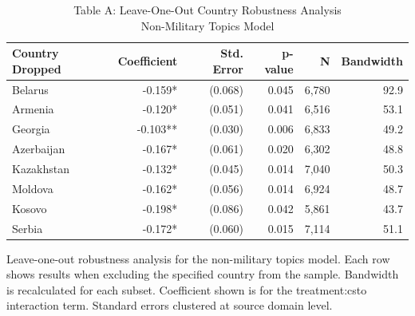 \begin{table}[!t]
\caption*{
{\large Table A: Leave-One-Out Country Robustness Analysis} \\ 
{\small Non-Military Topics Model}
} 
\fontsize{12.0pt}{14.4pt}\selectfont
\begin{tabular*}{\linewidth}{@{\extracolsep{\fill}}lrrrrr}
\toprule
Country Dropped & Coefficient & Std. Error & p-value & N & Bandwidth \\ 
\midrule\addlinespace[2.5pt]
Belarus & -0.159* & (0.068) & 0.045 & 6,780 & 92.9 \\ 
Armenia & -0.120* & (0.051) & 0.041 & 6,516 & 53.1 \\ 
Georgia & -0.103** & (0.030) & 0.006 & 6,833 & 49.2 \\ 
Azerbaijan & -0.167* & (0.061) & 0.020 & 6,302 & 48.8 \\ 
Kazakhstan & -0.132* & (0.045) & 0.014 & 7,040 & 50.3 \\ 
Moldova & -0.162* & (0.056) & 0.014 & 6,924 & 48.7 \\ 
Kosovo & -0.198* & (0.086) & 0.042 & 5,861 & 43.7 \\ 
Serbia & -0.172* & (0.060) & 0.015 & 7,114 & 51.1 \\ 
\bottomrule
\end{tabular*}
\begin{minipage}{\linewidth}
Leave-one-out robustness analysis for the non-military topics model. Each row
shows results when excluding the specified country from the sample. Bandwidth
is recalculated for each subset. Coefficient shown is for the treatment:csto
interaction term. Standard errors clustered at source domain level.\\
\end{minipage}
\end{table}

